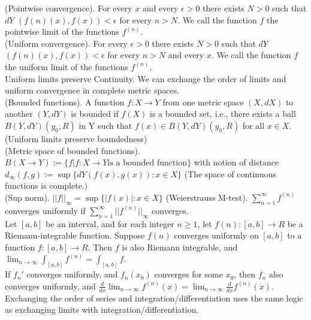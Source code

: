 \documentclass[10pt]{article}
\begin{document}
\begin{small}
    (Pointwise convergence). For every $x$ and every $\epsilon > 0$ there exists $N > 0$ such that $dY$ $(f(n)(x),f(x)) < \epsilon$ for every $n > N$. We call the function $f$ the pointwise limit of the functions $f^{(n)}$.\\
    
    (Uniform convergence). For every $\epsilon > 0$ there exists $N > 0$ such that $dY$ $(f(n)(x),f(x)) < \epsilon$ for every $n > N$ and every $x$. We call the function $f$ the uniform limit of the functions $f^{(n)}$.\\

    Uniform limits preserve Continuity. We can exchange the order of limits and uniform convergence in complete metric spaces.\\

    (Bounded functions). A function $f : X \rightarrow Y$ from one metric space $(X,dX)$ to another $(Y,dY)$ is bounded if $f(X)$ is a bounded set, i.e., there exists a ball $B(Y,dY )(y_0,R)$ in Y such that $f(x) \in B(Y,dY )(y_0, R)$ for all $x \in X$. (Uniform limits preserve boundedness)\\

    (Metric space of bounded functions). $B(X\rightarrow Y):=\{f|f:X\rightarrow Y \text{is a bounded function}\}$ with notion of distance $d_\infty(f,g) := \sup\{dY (f(x),g(x)) : x \in X\}$ (The space of continuous functions is complete.)\\

    (Sup norm). $||f||_\infty=\sup\{|f(x)|:x\in X\}$ (Weierstrauss M-test). $\displaystyle\sum_{n=1}^{\infty}f^{(n)}$ converges uniformly if $\displaystyle\sum_{n=1}^{\infty}||f^{(n)}||_\infty$ converges.\\

    Let $[a, b]$ be an interval, and for each integer $n \ge 1$, let $f (n) : [a, b] \rightarrow R$ be a Riemann-integrable function. Suppose $f (n)$ converges uniformly on $[a, b]$ to a function $f : [a, b] \rightarrow R$. Then $f$ is also Riemann integrable, and $\displaystyle\lim_{n\rightarrow\infty}\int_{[a,b]}f^{(n)}=\int_{[a,b]}f$.\\

    If $f_n'$ converges uniformly, and $f_n(x_0)$ converges for some $x_0$, then $f_n$ also converges uniformly, and $\frac{d}{dx}\lim_{n\rightarrow\infty}f^{(n)}(x)=\lim_{n\rightarrow\infty}\frac{d}{dx}f^{(n)}(x)$.\\

    Exchanging the order of series and integration/differentiation uses the same logic as exchanging limits with integration/differentiation.
\end{small}
    
\end{document}
